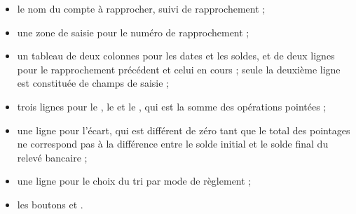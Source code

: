 \begin{itemize}
	\ifIllustration
	\label{reconciliation-infos-img}
	\fi
	 \item le nom du compte à rapprocher, suivi de \og rapprochement \fg{} ;
	 \item une zone de saisie  pour le numéro de rapprochement ;
	 \item un tableau de deux colonnes pour les dates et les soldes, et de deux lignes pour le rapprochement précédent et celui en cours ; seule la deuxième ligne est constituée de champs de saisie ; 
	 \item trois lignes pour le , le  et le , qui est la somme des opérations pointées ;
	 \item une ligne pour l'écart, qui est différent de zéro tant que le total des pointages ne correspond pas à la différence entre le solde initial et le solde final du relevé bancaire ;
	 \item une ligne pour le choix du \gls{tri} par mode de règlement ;
	 \item les boutons  et .
\end{itemize}


